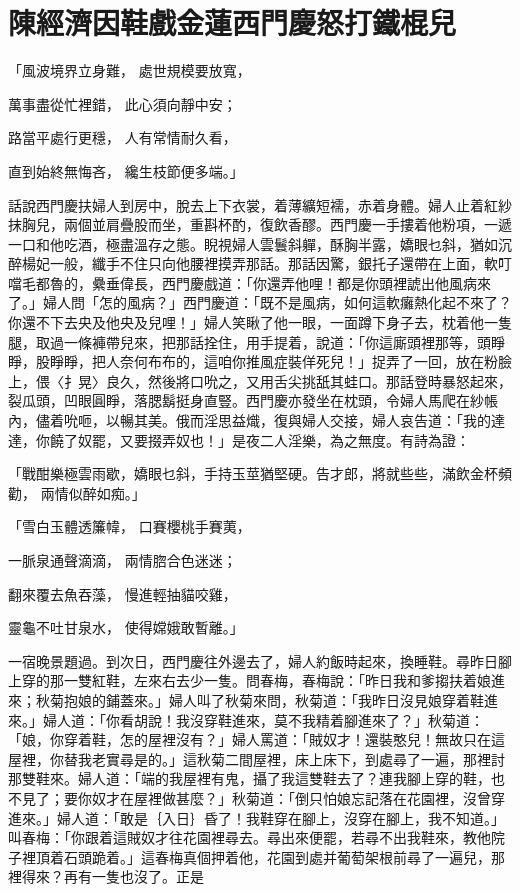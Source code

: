 %

\chapter{陳經濟因鞋戲金蓮\KG 西門慶怒打鐵棍兒}

「風波境界立身難，  處世規模要放寬，

萬事盡從忙裡錯，  此心須向靜中安；

路當平處行更穩，  人有常情耐久看，

直到始終無悔吝，  纔生枝節便多端。」

話說西門慶扶婦人到房中，脫去上下衣裳，着薄纊短襦，赤着身體。婦人止着紅紗抹胸兒，兩個並肩疊股而坐，重斟杯酌，復飲香醪。西門慶一手摟着他粉項，一遞一口和他吃酒，極盡溫存之態。睨視婦人雲鬟斜軃，酥胸半露，嬌眼乜斜，猶如沉醉楊妃一般，纖手不住只向他腰裡摸弄那話。那話因驚，銀托子還帶在上面，軟叮噹毛都魯的，纍垂偉長，西門慶戲道：「你還弄他哩！都是你頭裡諕出他風病來了。」婦人問「怎的風病？」西門慶道：「既不是風病，如何這軟癱熱化起不來了？你還不下去央及他央及兒哩！」婦人笑瞅了他一眼，一面蹲下身子去，枕着他一隻腿，取過一條褲帶兒來，把那話拴住，用手提着，說道：「你這廝頭裡那等，頭睜睜，股睜睜，把人奈何布布的，這咱你推風症裝佯死兒！」捉弄了一回，放在粉臉上，偎〈扌晃〉良久，然後將口吮之，又用舌尖挑舐其蛙口。那話登時暴怒起來，裂瓜頭，凹眼圓睜，落腮鬍挺身直豎。西門慶亦發坐在枕頭，令婦人馬爬在紗帳內，儘着吮咂，以暢其美。俄而淫思益熾，復與婦人交接，婦人哀告道：「我的達達，你饒了奴罷，又要掇弄奴也！」是夜二人淫樂，為之無度。有詩為證：

「戰酣樂極雲雨歇，嬌眼乜斜，手持玉莖猶堅硬。告才郎，將就些些，滿飲金杯頻勸，    兩情似醉如痴。」

「雪白玉體透簾幃，  口賽櫻桃手賽荑，

一脈泉通聲滴滴，  兩情脗合色迷迷；

翻來覆去魚吞藻，  慢進輕抽貓咬雞，

靈龜不吐甘泉水，  使得嫦娥敢暫離。」

一宿晚景題過。到次日，西門慶往外邊去了，婦人約飯時起來，換睡鞋。尋昨日腳上穿的那一雙紅鞋，左來右去少一隻。問春梅，春梅說：「昨日我和爹搊扶着娘進來；秋菊抱娘的鋪蓋來。」婦人叫了秋菊來問，秋菊道：「我昨日沒見娘穿着鞋進來。」婦人道：「你看胡說！我沒穿鞋進來，莫不我精着腳進來了？」秋菊道：「娘，你穿着鞋，怎的屋裡沒有？」婦人罵道：「賊奴才！還裝憨兒！無故只在這屋裡，你替我老實尋是的。」這秋菊二間屋裡，床上床下，到處尋了一遍，那裡討那雙鞋來。婦人道：「端的我屋裡有鬼，攝了我這雙鞋去了？連我腳上穿的鞋，也不見了；要你奴才在屋裡做甚麼？」秋菊道：「倒只怕娘忘記落在花園裡，沒曾穿進來。」婦人道：「敢是｛入日｝昏了！我鞋穿在腳上，沒穿在腳上，我不知道。」叫春梅：「你跟着這賊奴才往花園裡尋去。尋出來便罷，若尋不出我鞋來，教他院子裡頂着石頭跪着。」這春梅真個押着他，花園到處并葡萄架根前尋了一遍兒，那裡得來？再有一隻也沒了。正是

